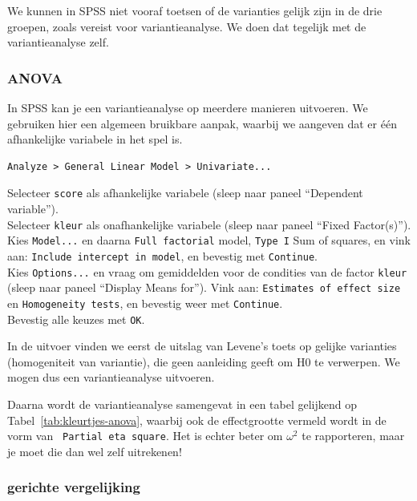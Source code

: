 \documentclass[
]{book}
\begin{document}
We kunnen in SPSS niet vooraf toetsen of de varianties gelijk zijn in de
drie groepen, zoals vereist voor variantieanalyse. We doen dat tegelijk
met de variantieanalyse zelf.

\hypertarget{anova}{%
\subsubsection{ANOVA}\label{anova}}

In SPSS kan je een variantieanalyse op meerdere manieren uitvoeren. We
gebruiken hier een algemeen bruikbare aanpak, waarbij we aangeven dat er
één afhankelijke variabele in het spel is.\\

\begin{verbatim}
Analyze > General Linear Model > Univariate...
\end{verbatim}

Selecteer \texttt{score} als afhankelijke variabele (sleep naar paneel
``Dependent variable'').\\
Selecteer \texttt{kleur} als onafhankelijke variabele (sleep naar paneel ``Fixed
Factor(s)'').\\
Kies \texttt{Model...} en daarna \texttt{Full\ factorial} model, \texttt{Type\ I} Sum
of squares, en vink aan: \texttt{Include\ intercept\ in\ model}, en bevestig met
\texttt{Continue}.\\
Kies \texttt{Options...} en vraag om gemiddelden voor de condities
van de factor \texttt{kleur} (sleep naar paneel ``Display Means for''). Vink aan:
\texttt{Estimates\ of\ effect\ size} en \texttt{Homogeneity\ tests}, en bevestig weer met
\texttt{Continue}.\\
Bevestig alle keuzes met \texttt{OK}.

In de uitvoer vinden we eerst de uitslag van Levene's toets op gelijke
varianties (homogeniteit van variantie), die geen aanleiding geeft om H0
te verwerpen. We mogen dus een variantieanalyse uitvoeren.

Daarna wordt de variantieanalyse samengevat in een tabel gelijkend op
Tabel~\ref{tab:kleurtjes-anova}, waarbij ook de effectgrootte vermeld
wordt in de vorm van \texttt{~Partial\ eta\ square}. Het is echter beter om
\(\omega^2\) te rapporteren, maar je moet die dan wel zelf uitrekenen!

\hypertarget{gerichte-vergelijking}{%
\subsubsection{gerichte vergelijking}\label{gerichte-vergelijking}}
\end{document}
